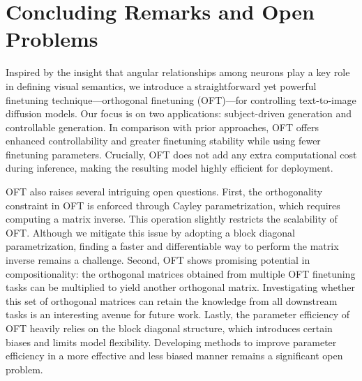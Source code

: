 \section{Concluding Remarks and Open Problems}

Inspired by the insight that angular relationships among neurons play a key role in defining visual semantics, we introduce a straightforward yet powerful finetuning technique—orthogonal finetuning (OFT)—for controlling text-to-image diffusion models. Our focus is on two applications: subject-driven generation and controllable generation. In comparison with prior approaches, OFT offers enhanced controllability and greater finetuning stability while using fewer finetuning parameters. Crucially, OFT does not add any extra computational cost during inference, making the resulting model highly efficient for deployment.

OFT also raises several intriguing open questions. First, the orthogonality constraint in OFT is enforced through Cayley parametrization, which requires computing a matrix inverse. This operation slightly restricts the scalability of OFT. Although we mitigate this issue by adopting a block diagonal parametrization, finding a faster and differentiable way to perform the matrix inverse remains a challenge. Second, OFT shows promising potential in compositionality: the orthogonal matrices obtained from multiple OFT finetuning tasks can be multiplied to yield another orthogonal matrix. Investigating whether this set of orthogonal matrices can retain the knowledge from all downstream tasks is an interesting avenue for future work. Lastly, the parameter efficiency of OFT heavily relies on the block diagonal structure, which introduces certain biases and limits model flexibility. Developing methods to improve parameter efficiency in a more effective and less biased manner remains a significant open problem.

